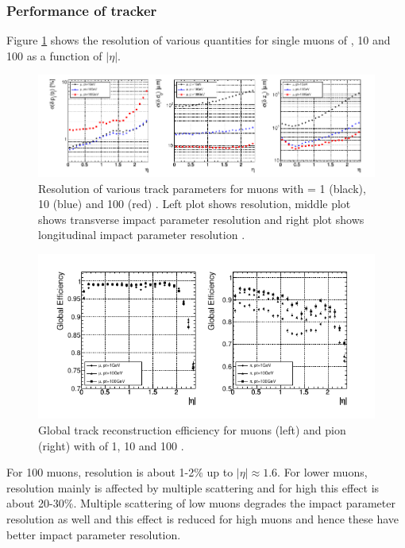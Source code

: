 \subsubsection{Performance of tracker}
Figure \ref{fig:trackerResoln_muons} shows the resolution of various quantities for single muons of , 10 and 100 \gev as a function of $|\eta|$.
\begin{figure}[h!]
\centering
\includegraphics[width=0.98\linewidth]{../Figures/Chap2/trackerResoln_muons}
\captionsetup{width=.9\linewidth}
\caption[Tracker resolution for muons]{Resolution of various track parameters for muons with \pt = 1 \gev (black), 10 \gev (blue) and 100 \gev (red) . Left plot shows \pt resolution, middle plot shows transverse impact parameter resolution and right plot shows longitudinal impact parameter resolution \cite{Chatrchyan:2008aa}.}
\label{fig:trackerResoln_muons}
\end{figure}
\begin{figure}[h!]
\centering
\includegraphics[width=0.98\linewidth]{../Figures/Chap2/trackerEff_muPions}
\caption[Track reconstruction efficiency]{Global track reconstruction efficiency for muons (left) and pion (right) with \pt of 1, 10 and 100 \gev \cite{Chatrchyan:2008aa}.}
\label{fig:trackerEff_muPions}
\end{figure}

For 100 \gev muons, \pt resolution is about 1-2\% up to $|\eta| \approx 1.6$. For lower \pt muons, resolution mainly is affected by multiple scattering and for high \pt this effect is about 20-30\%. Multiple scattering of low \pt muons degrades the impact parameter resolution as well and this effect is reduced for high \pt muons and hence these have better impact parameter resolution.

